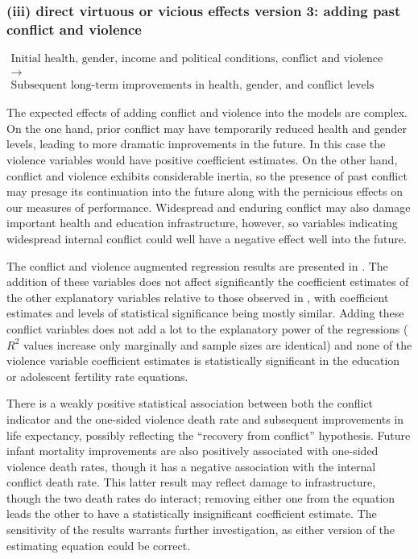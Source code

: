 \documentclass[12pt]{article}
\begin{document}
\subsubsection*{(iii) direct virtuous or vicious effects version 3: adding past conflict and violence }

\begin{equation*}\begin{gathered}
\text{Initial health, gender, income and political conditions, conflict and violence conditions} \\
\longrightarrow \\
\text{Subsequent long-term improvements in health, gender, and conflict levels}
\end{gathered}\end{equation*}
\bigskip

The expected effects of adding conflict and violence into the models are complex. On the one hand, prior conflict may have temporarily reduced health and gender levels, leading to more dramatic improvements in the future. In this case the violence variables would have positive coefficient estimates. On the other hand, conflict and violence exhibits considerable inertia, so the presence of past conflict may presage its continuation into the future along with the pernicious effects on our measures of performance.  Widespread and enduring conflict may also damage important health and education infrastructure, however, so variables indicating widespread internal conflict could well have a negative effect well into the future.



The conflict and violence augmented regression results are presented in . The addition of these variables does not affect significantly the coefficient estimates of the other explanatory variables relative to those observed in , with coefficient estimates and levels of statistical significance being mostly similar. Adding these conflict variables does not add a lot to the explanatory power of the regressions ($R^2$ values increase only marginally and sample sizes are identical) and none of the violence variable coefficient estimates is statistically significant in the education or adolescent fertility rate equations.

There is a weakly positive statistical association between both the conflict indicator and the one-sided violence death rate and subsequent improvements in life expectancy, possibly reflecting the \enquote{recovery from conflict} hypothesis. Future infant mortality improvements are also positively associated with one-sided violence death rates, though it has a negative association with the internal conflict death rate. This latter result may reflect damage to infrastructure, though the two death rates do interact; removing either one from the equation leads the other to have a statistically insignificant coefficient estimate. The sensitivity of the results warrants further investigation, as either version of the estimating equation could be correct.
\end{document}
